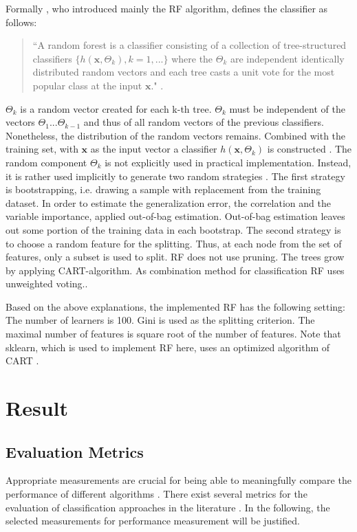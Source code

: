 \documentclass[12pt, a4paper, titlepage]{article}
\begin{document}
Formally \citet{breiman2001}, who introduced mainly the \ac{RF} algorithm, defines the classifier as follows:

\begin{quote}
``A random forest is a classifier consisting of a collection of tree-structured classifiers $\{h(\textbf{x}, \Theta_k), k = 1, ...\}$ where the ${\Theta_k}$ are independent identically distributed random vectors and each tree casts a unit vote for the most popular class at the input $\textbf{x}$." \citep[6]{breiman2001}. 
\end{quote}
$\Theta_k$ is a random vector created for each k-th tree. $\Theta_k$ must be independent of the vectors $\Theta_1...\Theta_{k-1}$ and thus of all random vectors of the previous classifiers. Nonetheless, the distribution of the random vectors remains. Combined with the training set, with $\textbf{x}$ as the input vector a classifier $h(\textbf{x}, \Theta_k)$ is constructed \citep{breiman2001}. The random component $\Theta_k$ is not explicitly used in practical implementation. Instead, it is rather used implicitly to generate two random strategies \citep{cutler2012}. The first strategy is bootstrapping, i.e. drawing a sample with replacement from the training dataset. In order to estimate the generalization error, the correlation and the variable importance, \citet{breiman2001} applied out-of-bag estimation. Out-of-bag estimation leaves out some portion of the training data in each bootstrap. The second strategy is to choose a random feature for the splitting. Thus, at each node from the set of features, only a subset is used to split. \ac{RF} does not use pruning. The trees grow by applying \ac{CART}-algorithm. As combination method for classification \ac{RF} uses unweighted voting.\citep{cutler2012}.

Based on the above explanations, the implemented \ac{RF} has the following setting: The number of learners is 100. Gini is used as the splitting criterion. The maximal number of features is square root of the number of features. Note that sklearn, which is used to implement \ac{RF} here, uses an optimized algorithm of \ac{CART} \citep{scikit-learn}.

\section{Result}
\subsection{Evaluation Metrics}
Appropriate measurements are crucial for being able to meaningfully compare the performance of different algorithms \citep{Ferri2009}. There exist several metrics for the evaluation of classification approaches in the literature \citep{Fatourechi2008}. In the following, the selected measurements for performance measurement will be justified. 
\end{document}
